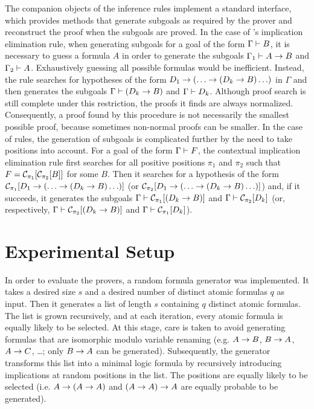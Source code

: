 \documentclass{llncs}
\begin{document}
The companion objects of the inference rules implement a standard interface, which provides methods that generate subgoals as required by the prover and reconstruct the proof when the subgoals are proved. In the case of {\ND}'s implication elimination rule, when generating subgoals for a goal of the form $\Gamma \vdash B$, it is necessary to guess a formula $A$ in order to generate the subgoals $\Gamma_1 \vdash A \rightarrow B$ and $\Gamma_2 \vdash A$. Exhaustively guessing all possible formulas would be inefficient. Instead, the rule searches for hypotheses of the form $D_1 \rightarrow (\ldots \rightarrow (D_k \rightarrow B)\ldots)$ in $\Gamma$ and then generates the subgoals $\Gamma \vdash (D_k \rightarrow B)$ and $\Gamma \vdash D_k$. Although proof search is still complete under this restriction, the proofs it finds are always normalized. Consequently, a proof found by this procedure is not necessarily the smallest possible proof, because sometimes non-normal proofs can be smaller. In the case of {\NDd} rules, the generation of subgoals is complicated further by the need to take positions into account. For a goal of the form $\Gamma \vdash F$, the contextual implication elimination rule first searches for all positive positions $\pi_1$ and $\pi_2$ such that $F = \mathcal{C}_{\pi_1}[\mathcal{C}_{\pi_2}[B]]$ for some $B$. Then it searches for a hypothesis of the form $\mathcal{C}_{\pi_1}[D_1 \rightarrow (\ldots \rightarrow (D_k \rightarrow B)\ldots)]$ (or $\mathcal{C}_{\pi_2}[D_1 \rightarrow (\ldots \rightarrow (D_k \rightarrow B)\ldots)]$) and, if it succeeds, it generates the subgoals $\Gamma \vdash \mathcal{C}_{\pi_1}[(D_k \rightarrow B)]$ and $\Gamma \vdash \mathcal{C}_{\pi_2}[D_k]$ (or, respectively, $\Gamma \vdash \mathcal{C}_{\pi_2}[(D_k \rightarrow B)]$ and $\Gamma \vdash \mathcal{C}_{\pi_1}[D_k]$).


\section{Experimental Setup}
\label{sec:ExperimentalSetup}

In order to evaluate the provers, a random formula generator was implemented. It takes a desired size $s$ and a desired number of distinct atomic formulas $q$ as input. Then it generates a list of length $s$ containing $q$ distinct atomic formulas. The list is grown recursively, and at each iteration, every atomic formula is equally likely to be selected. At this stage, care is taken to avoid generating formulas that are isomorphic modulo variable renaming (e.g. $A \rightarrow B$, $B \rightarrow A$, $A \rightarrow C$, \ldots; only $B \rightarrow A$ can be generated). Subsequently, the generator transforms this list into a minimal logic formula by recursively introducing implications at random positions in the list. The positions are equally likely to be selected (i.e. $A \rightarrow (A \rightarrow A)$ and $(A \rightarrow A) \rightarrow A$ are equally probable to be generated).
\end{document}
